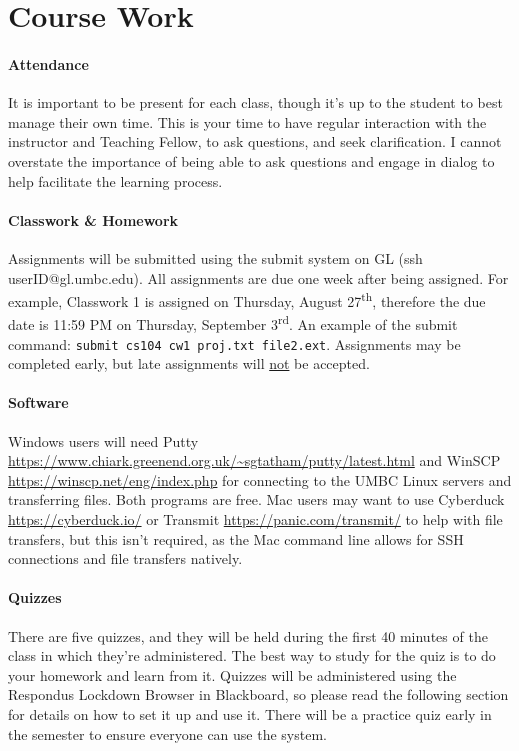 \documentclass[letter,11pt]{article}
\begin{document}
\section*{Course Work}
\paragraph{Attendance}It is important to be present for each class, though it's up to the student to best manage their own time. This is your time to have regular interaction with the instructor and Teaching Fellow, to ask questions, and seek clarification. I cannot overstate the importance of being able to ask questions and engage in dialog to help facilitate the learning process.

\paragraph{Classwork \& Homework}Assignments will be submitted using the submit system on GL (ssh userID@gl.umbc.edu). All assignments are due one week after being assigned. For example, Classwork 1 is assigned on Thursday, August 27\textsuperscript{th}, therefore the due date is 11:59 PM on Thursday, September 3\textsuperscript{rd}. An example of the submit command: \texttt{submit cs104 cw1 proj.txt file2.ext}. Assignments may be completed early, but late assignments will \underline{not} be accepted.

\paragraph{Software} Windows users will need Putty \url{https://www.chiark.greenend.org.uk/~sgtatham/putty/latest.html} and WinSCP \url{https://winscp.net/eng/index.php} for connecting to the UMBC Linux servers and transferring files. Both programs are free. Mac users may want to use Cyberduck \url{https://cyberduck.io/} or Transmit \url{https://panic.com/transmit/} to help with file transfers, but this isn't required, as the Mac command line allows for SSH connections and file transfers natively.

\paragraph{Quizzes}There are five quizzes, and they will be held during the first 40 minutes of the class in which they're administered. The best way to study for the quiz is to do your homework and learn from it. Quizzes will be administered using the Respondus Lockdown Browser in Blackboard, so please read the following section for details on how to set it up and use it. There will be a practice quiz early in the semester to ensure everyone can use the system.
\end{document}
